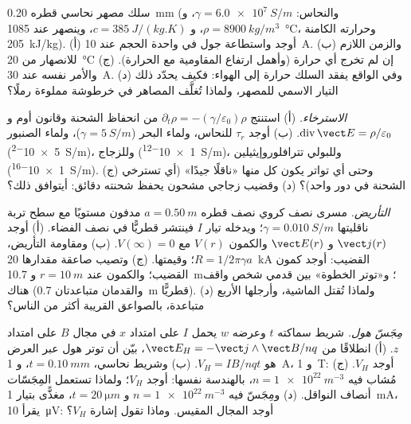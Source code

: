 \begin{exercise}[$\star\star$]\label{exo:b2:charges-currents-conduction:8}
سلك مصهر نحاسي قطره \qty{0.20}{mm} (والنحاس: $\gamma = \qty{6.0e7}{S/m}$، و $\rho =
\qty{8900}{kg/m^3}$، و $c = \qty{385}{J/(kg.K)}$، وينصهر عند \qty{1085}{\degreeCelsius}،
وحرارته الكامنة \qty{205}{kJ/kg}). (أ) أوجد  واستطاعة جول في
واحدة الحجم عند \qty{10}{A}. (ب) والزمن اللازم للانصهار من \qty{20}{\degreeCelsius} إن لم
تخرج أي حرارة (وأهمل ارتفاع المقاومية مع الحرارة). (ج)
والأمر نفسه عند \qty{30}{A}. (د) وفي الواقع يفقد السلك حرارة إلى الهواء: فكيف
يحدّد ذلك التيار الاسمي للمصهر، ولماذا تُغلَّف المصاهر في
خرطوشة مملوءة رملًا؟
\end{exercise}

\begin{exercise}[$\star\star$]\label{exo:b2:charges-currents-conduction:9}
\emph{الاسترخاء.} (أ) استنتج $\partial_t\rho = -(\gamma/\varepsilon_0)\rho$ من انحفاظ
الشحنة وقانون أوم و $\operatorname{div}\vect E = \rho/\varepsilon_0$. (ب)
أوجد $\tau_r$ للنحاس، ولماء البحر ($\gamma = \qty{5}{S/m}$)، ولماء الصنبور
(\qty{5e-2}{S/m})، وللزجاج (\qty{1e-12}{S/m})، وللبولي تترافلوروإيثيلين (\qty{1e-16}{S/m}). (ج)
وحتى أي تواتر يكون كل منها «ناقلًا جيدًا» (أي تسترخي الشحنة في
دور واحد)؟ (د) وقضيب زجاجي مشحون يحفظ شحنته دقائق: أيتوافق
ذلك؟
\end{exercise}

\begin{exercise}[$\star\star\star$]\label{exo:b2:charges-currents-conduction:10}
\emph{التأريض.} مسرى نصف كروي نصف قطره $a = \qty{0.50}{m}$
مدفون مستويًا مع سطح تربة ناقليتها $\gamma =
\qty{0.010}{S/m}$؛ ويدخله تيار $I$ فينتشر قطريًّا في
نصف الفضاء. (أ) أوجد $\vect j(r)$ و $\vect E(r)$ والكمون $V(r)$ مع $V(\infty) = 0$.
(ب) ومقاومة التأريض، $R = 1/2\pi\gamma a$؛ وقيمتها. (ج) وتصيب
صاعقة مقدارها \qty{20}{kA} القضيب: أوجد كمون القضيب؛
والكمون عند $r = \qty{10}{m}$ و \qty{10.7}{m}؛ و«توتر الخطوة» بين
قدمي شخص واقف هناك (والقدمان متباعدتان \qty{0.7}{m} قطريًّا).
(د) ولماذا تُقتل الماشية، وأرجلها الأربع متباعدة، بالصواعق
القريبة أكثر من الناس؟
\end{exercise}

\begin{exercise}[$\star\star\star$]\label{exo:b2:charges-currents-conduction:11}
\emph{مِجَسّ هول.} شريط سماكته $t$ وعرضه $w$ يحمل $I$
على امتداد $x$ في مجال $B$ على امتداد $z$. (أ) انطلاقًا من $\vect E_H = -\vect j\wedge\vect B
/nq$، بيّن أن توتر هول عبر العرض هو $V_H = IB/nqt$. (ب)
وشريط نحاسي، $t = \qty{0.10}{mm}$، و \qty{1}{A}، و \qty{1}{T}: أوجد $V_H$. (ج) 
مُشاب فيه $n = \qty{1e22}{m^{-3}}$، بالهندسة نفسها: أوجد $V_H$؛ ولماذا
تستعمل المِجَسّات أنصاف النواقل. (د) ومِجَسّ فيه $n = \qty{1e22}{m^{-3}}$ و $t =
\qty{20}{\micro m}$، مغذًّى بتيار \qty{1}{mA}، يقرأ \qty{10}{\micro V}: أوجد المجال المقيس.
وماذا تقول إشارة $V_H$؟
\end{exercise}


